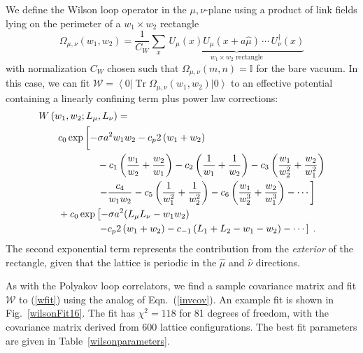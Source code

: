 \documentclass[preprint,aps,prd]{revtex4-2}
\newcommand{\be}{\begin{equation}}
\newcommand{\eq}{\end{equation}}
\newcommand\wilson[4]{\Omega_{#1, #2}\left(#3,#4\right)}
\DeclareMathOperator{\Tr}{Tr}
\begin{document}
We define the Wilson loop operator in the $\mu,\nu$-plane using a product of
link fields lying on the perimeter of a $w_1\times w_2$ rectangle
\be
       \wilson{\mu}{\nu}{w_1}{w_2} = \frac{1}{C_W} \sum_{x}\,
         \underbrace{U_\mu(x) U_\mu(x+a \hat{\mu}) \,\cdots\, U_\nu^\dagger (x)
         }_{\mbox{$w_1\times w_2$ rectangle}}
\eq
with normalization $C_W$ chosen such that $\wilson{\mu}{\nu}{m}{n} = \mathbb{I}$
for the bare vacuum.  In this case, we can fit
$\mathcal{W} = \left\langle 0 \right|
 \Tr \wilson{\mu}{\nu}{w_1}{w_2} \left|0\right\rangle $
to an effective potential containing a linearly confining term
plus power law corrections:
%
\begin{align}
  \MoveEqLeft W\left(w_1, w_2; L_\mu, L_\nu\right) =  \nonumber \\
       & c_0 \exp\left[
       -\sigma a^2 w_1 w_2 
       - c_p  2\left(w_1+w_2\right)
       \vphantom{\frac{w_1}{w_2}}\right. \nonumber \\ & \hspace{4em}
        - c_1 \left(\frac{w_1}{w_2}+\frac{w_2}{w_1}\right)
           - c_2 \left(\frac{1}{w_1}+\frac{1}{w_2}\right)
           - c_3 \left(\frac{w_1}{w_2^2}+\frac{w_2}{w_1^2}\right)
           \nonumber \\ & \hspace{4em} \left.
           - \frac{c_4}{w_1 w_2}
           - c_5 \left(\frac{1}{w_1^2}+\frac{1}{w_2^2}\right)
           - c_6 \left(\frac{w_1}{w_2^3}+\frac{w_2}{w_1^3}\right) - \cdots
       \right]\nonumber\\ &
      \mbox{} + c_0 \exp\left[
       -\sigma a^2 (L_\mu L_\nu - w_1 w_2)
       \right. \nonumber \\ & \hspace{4em} \left.
       - c_p  2\left(w_1+w_2\right) 
     - c_{-1}\left(L_1 +L_2 - w_1 -w_2\right) - \cdots
     \right]\; .  \label{wfit}
\end{align}
%
The second exponential term represents the contribution from
the {\em exterior} of the rectangle, given that the lattice
is periodic in the $\hat{\mu}$ and $\hat\nu$ directions.

As with the Polyakov loop correlators, we find a sample
covariance matrix and fit $\mathcal{W}$ to (\ref{wfit})
using the analog of Eqn.~(\ref{invcov}).
An example fit is shown in Fig.~\ref{wilsonFit16}.  
The fit has $\chi^2=118$ for 81 degrees of freedom,
with the covariance matrix derived from 600 lattice configurations.
The best fit parameters are given in Table~\ref{wilsonparameters}.
\end{document}
